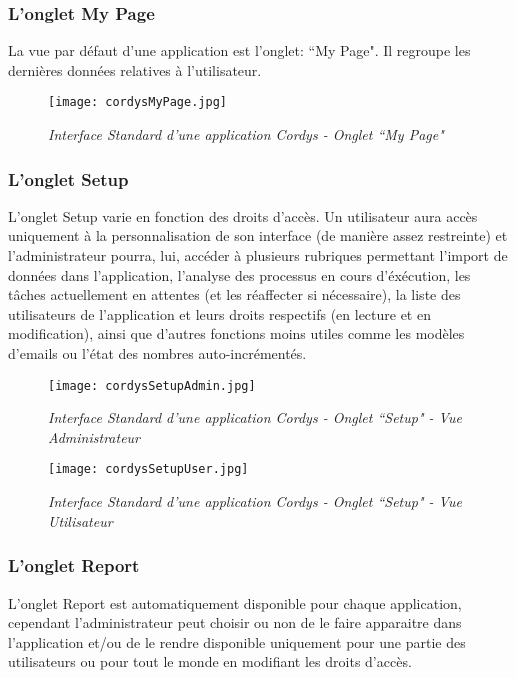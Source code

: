 \subsubsection{L'onglet My Page}

La vue par défaut d'une application est l'onglet: ``My Page". Il regroupe les dernières données relatives à l'utilisateur.

 \begin{figure}[H]
    \centering
    \texttt{[image: cordysMyPage.jpg]}
	\caption{\textit{Interface Standard d'une application Cordys - Onglet ``My Page"}}\label{image.CordysMyPage} 
\end{figure}

\subsubsection{L'onglet Setup}

L'onglet Setup varie en fonction des droits d'accès. Un utilisateur aura accès uniquement à la personnalisation de son interface (de manière assez restreinte) et l'administrateur pourra, lui, accéder à plusieurs rubriques permettant l'import de données dans l'application, l'analyse des processus en cours d'éxécution, les tâches actuellement en attentes (et les réaffecter si nécessaire), la liste des utilisateurs de l'application et leurs droits respectifs (en lecture et en modification), ainsi que d'autres fonctions moins utiles comme les modèles d'emails ou l'état des nombres auto-incrémentés.

 \begin{figure}[H]
    \centering
    \texttt{[image: cordysSetupAdmin.jpg]}
	\caption{\textit{Interface Standard d'une application Cordys - Onglet ``Setup" - Vue Administrateur}}\label{image.CordysSetupAdmin} 
\end{figure}

 \begin{figure}[H]
    \centering
    \texttt{[image: cordysSetupUser.jpg]}
	\caption{\textit{Interface Standard d'une application Cordys - Onglet ``Setup" - Vue Utilisateur}}\label{image.CordysSetupUser} 
\end{figure}

\clearpage

\subsubsection{L'onglet Report}

L'onglet Report est automatiquement disponible pour chaque application, cependant l'administrateur peut choisir ou non de le faire apparaitre dans l'application et/ou de le rendre disponible uniquement pour une partie des utilisateurs ou pour tout le monde en modifiant les droits d'accès.

